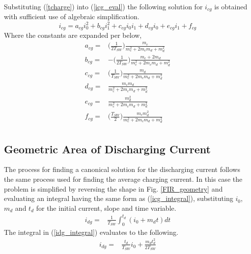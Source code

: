 \documentclass[conference]{IEEEtran}
\begin{document}
Substituting (\ref{tcharge}) into (\ref{icg_eval}) the following solution for \(i_{cg}\) is obtained with sufficient use of algebraic simplification.
\begin{equation}
i_{cg} = a_{cg}i_0^2+b_{cg}i_1^2+c_{cg}i_0i_1+d_{cg}i_0+e_{cg}i_1+f_{cg} \label{i_cg_canon}
\end{equation}
Where the constants are expanded per below,
\begin{align*}
a_{cg} = & \bigg( \frac{1}{2T_{SW}} \bigg) \frac{m_c}{m_c^2+2m_cm_d+m_d^2} \nonumber\\
b_{cg} = & - \bigg( \frac{1}{2T_{SW}} \bigg) \frac{m_c + 2m_d}{m_c^2+2m_cm_d+m_d^2} \nonumber\\
c_{cg} = & \bigg( \frac{1}{T_{SW}} \bigg)  \frac{m_d}{m_c^2+2m_cm_d+m_d^2} \nonumber\\
d_{cg} = & \frac{m_cm_d}{m_c^2+2m_cm_d+m_d^2}\nonumber\\
e_{cg} = & \frac{m_d^2}{m_c^2+2m_cm_d+m_d^2}\nonumber\\
f_{cg} = & \bigg( \frac{T_{SW}}{2} \bigg) \frac{m_c m_d^2}{m_c^2+2m_cm_d+m_d^2} \nonumber\\
\end{align*}

\subsection{Geometric Area of Discharging Current}
The process for finding a canonical solution for the discharging current follows the same process used for finding the average charging current. In this case the problem is simplified by reversing the shape in Fig. \ref{FIR_geometry} and evaluating an integral having the same form as (\ref{icg_integral}), substituting $i_0$, $m_d$ and $t_d$ for the initial current, slope and time variable.
\begin{align}
i_{dg} = & \frac{1}{T_{SW}}\int_0^{t_d}(i_0 + m_d t)dt \label{idg_integral}
\end{align}
The integral in (\ref{idg_integral}) evaluates to the following.
\begin{align}
i_{dg} = & \frac{t_d}{T_{SW}} i_0 + \frac{m_dt_d^2}{2T_{SW}}
\label{idg_integral_eval}
\end{align}
\end{document}
